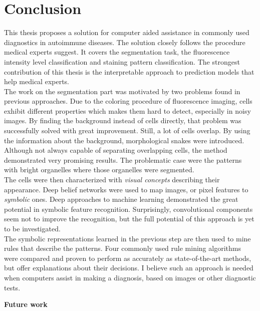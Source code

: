 \chapter{Conclusion}

\label{Conclusion}

This thesis proposes a solution for computer aided assistance in commonly used diagnostics in autoimmune diseases. The solution closely follows the procedure medical experts suggest. It covers the segmentation task,  the fluorescence intensity level classification and staining pattern classification. The strongest contribution of this thesis is the interpretable approach to prediction models that help medical experts. \\

The work on the segmentation part was motivated by two problems found in previous approaches. Due to the coloring procedure of fluorescence imaging, cells exhibit different properties which makes them hard to detect, especially in noisy images. By finding the background instead of cells directly, that problem was successfully solved with great improvement. Still, a lot of cells overlap.  By using the information about the background, morphological snakes were introduced. Although not always capable of separating overlapping cells, the method demonstrated very promising results. The problematic case were the patterns with bright organelles where those organelles were segmented. \\

The cells were then characterized with \textit{visual concepts} describing their appearance. Deep belief networks were used to map images, or pixel features to \textit{symbolic} ones. Deep approaches to machine learning demonstrated the great potential in symbolic feature recognition. Surprisingly, convolutional components seem not to improve the recognition, but the full potential of this approach is yet to be investigated. \\

The symbolic representations learned in the previous step are then used to mine rules that describe the patterns. Four commonly used rule mining algorithms were compared and proven to perform as accurately as state-of-the-art methods, but offer explanations about their decisions. I believe such an approach is needed when computers assist in making a diagnosis, based on images or other diagnostic tests.

\begin{flushleft}
	\large
	\vspace{15pt}
	\textbf{Future work}
\end{flushleft}

